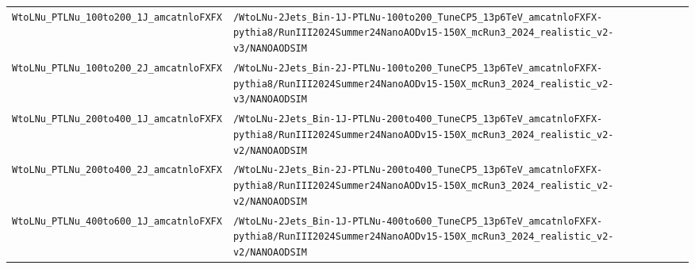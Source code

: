 \begin{longtable}{@{}>{\RaggedRight\arraybackslash}p{} >{\RaggedRight\arraybackslash}p{}@{}}
\addlinespace[2pt]
\texttt{WtoLNu\_\allowbreak{}PTLNu\_\allowbreak{}100to200\_\allowbreak{}1J\_\allowbreak{}amcatnloFXFX} & \texttt{/\allowbreak{}WtoLNu-\allowbreak{}2Jets\_\allowbreak{}Bin-\allowbreak{}1J-\allowbreak{}PTLNu-\allowbreak{}100to200\_\allowbreak{}TuneCP5\_\allowbreak{}13p6TeV\_\allowbreak{}amcatnloFXFX-\allowbreak{}pythia8/\allowbreak{}RunIII2024Summer24NanoAODv15-\allowbreak{}150X\_\allowbreak{}mcRun3\_\allowbreak{}2024\_\allowbreak{}realistic\_\allowbreak{}v2-\allowbreak{}v3/\allowbreak{}NANOAODSIM} \\
\addlinespace[2pt]
\texttt{WtoLNu\_\allowbreak{}PTLNu\_\allowbreak{}100to200\_\allowbreak{}2J\_\allowbreak{}amcatnloFXFX} & \texttt{/\allowbreak{}WtoLNu-\allowbreak{}2Jets\_\allowbreak{}Bin-\allowbreak{}2J-\allowbreak{}PTLNu-\allowbreak{}100to200\_\allowbreak{}TuneCP5\_\allowbreak{}13p6TeV\_\allowbreak{}amcatnloFXFX-\allowbreak{}pythia8/\allowbreak{}RunIII2024Summer24NanoAODv15-\allowbreak{}150X\_\allowbreak{}mcRun3\_\allowbreak{}2024\_\allowbreak{}realistic\_\allowbreak{}v2-\allowbreak{}v3/\allowbreak{}NANOAODSIM} \\
\addlinespace[2pt]
\texttt{WtoLNu\_\allowbreak{}PTLNu\_\allowbreak{}200to400\_\allowbreak{}1J\_\allowbreak{}amcatnloFXFX} & \texttt{/\allowbreak{}WtoLNu-\allowbreak{}2Jets\_\allowbreak{}Bin-\allowbreak{}1J-\allowbreak{}PTLNu-\allowbreak{}200to400\_\allowbreak{}TuneCP5\_\allowbreak{}13p6TeV\_\allowbreak{}amcatnloFXFX-\allowbreak{}pythia8/\allowbreak{}RunIII2024Summer24NanoAODv15-\allowbreak{}150X\_\allowbreak{}mcRun3\_\allowbreak{}2024\_\allowbreak{}realistic\_\allowbreak{}v2-\allowbreak{}v2/\allowbreak{}NANOAODSIM} \\
\addlinespace[2pt]
\texttt{WtoLNu\_\allowbreak{}PTLNu\_\allowbreak{}200to400\_\allowbreak{}2J\_\allowbreak{}amcatnloFXFX} & \texttt{/\allowbreak{}WtoLNu-\allowbreak{}2Jets\_\allowbreak{}Bin-\allowbreak{}2J-\allowbreak{}PTLNu-\allowbreak{}200to400\_\allowbreak{}TuneCP5\_\allowbreak{}13p6TeV\_\allowbreak{}amcatnloFXFX-\allowbreak{}pythia8/\allowbreak{}RunIII2024Summer24NanoAODv15-\allowbreak{}150X\_\allowbreak{}mcRun3\_\allowbreak{}2024\_\allowbreak{}realistic\_\allowbreak{}v2-\allowbreak{}v2/\allowbreak{}NANOAODSIM} \\
\addlinespace[2pt]
\texttt{WtoLNu\_\allowbreak{}PTLNu\_\allowbreak{}400to600\_\allowbreak{}1J\_\allowbreak{}amcatnloFXFX} & \texttt{/\allowbreak{}WtoLNu-\allowbreak{}2Jets\_\allowbreak{}Bin-\allowbreak{}1J-\allowbreak{}PTLNu-\allowbreak{}400to600\_\allowbreak{}TuneCP5\_\allowbreak{}13p6TeV\_\allowbreak{}amcatnloFXFX-\allowbreak{}pythia8/\allowbreak{}RunIII2024Summer24NanoAODv15-\allowbreak{}150X\_\allowbreak{}mcRun3\_\allowbreak{}2024\_\allowbreak{}realistic\_\allowbreak{}v2-\allowbreak{}v2/\allowbreak{}NANOAODSIM} \\

\end{longtable}
